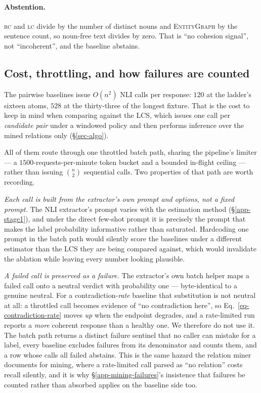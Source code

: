 \paragraph{Abstention.} \textsc{rc} and \textsc{lc} divide by the number of distinct nouns and
\textsc{EntityGraph} by the sentence count, so noun-free text divides by zero. That is ``no cohesion
signal'', not ``incoherent'', and the baseline abstains.


\subsection{Cost, throttling, and how failures are counted}
\label{app-baseline-cost}

The pairwise baselines issue $O(n^2)$ NLI calls per response: $120$ at the ladder's sixteen atoms,
$528$ at the thirty-three of the longest fixture. That is the cost to keep in mind when comparing
against the LCS, which issues one call per \emph{candidate pair} under a windowed policy and then
performs inference over the mined relations only (\S\ref{sec-algo}).

All of them route through one throttled batch path, sharing the pipeline's limiter --- a
$1500$-requests-per-minute token bucket and a bounded in-flight ceiling --- rather than issuing
$\binom{n}{2}$ sequential calls. Two properties of that path are worth recording.

\emph{Each call is built from the extractor's own prompt and options, not a fixed prompt.} The NLI
extractor's prompt varies with the estimation method (\S\ref{app-stage1}), and under the direct
few-shot prompt it is precisely the prompt that makes the label probability informative rather than
saturated. Hardcoding one prompt in the batch path would silently score the baselines under a
different estimator than the LCS they are being compared against, which would invalidate the ablation
while leaving every number looking plausible.

\emph{A failed call is preserved as a failure.} The extractor's own batch helper maps a failed call
onto a neutral verdict with probability one --- byte-identical to a genuine neutral. For a
contradiction-\emph{rate} baseline that substitution is not neutral at all: a throttled call becomes
evidence of ``no contradiction here'', so Eq.~\ref{eq-contradiction-rate} moves \emph{up} when the
endpoint degrades, and a rate-limited run reports a \emph{more} coherent response than a healthy one.
We therefore do not use it. The batch path returns a distinct failure sentinel that no caller can
mistake for a label, every baseline excludes failures from its denominator and counts them, and a row
whose calls all failed abstains. This is the same hazard the relation miner documents for mining,
where a rate-limited call parsed as ``no relation'' costs recall silently, and it is why
\S\ref{app-mining-failures}'s insistence that failures be counted rather than absorbed applies on the
baseline side too.

